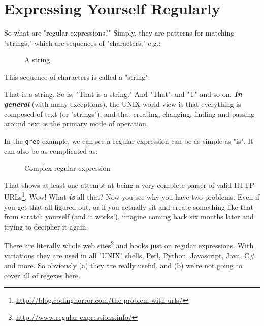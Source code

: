 \documentclass[10pt,american,]{book}
\newenvironment{Shaded}{\begin{snugshade}}{\end{snugshade}}
\newcommand{\KeywordTok}[1]{\textcolor[rgb]{0.13,0.29,0.53}{\textbf{{#1}}}}
\newcommand{\StringTok}[1]{\textcolor[rgb]{0.31,0.60,0.02}{{#1}}}
\newcommand{\NormalTok}[1]{{#1}}
\renewcommand{\href}[2]{#2\footnote{\url{#1}}}
\numberwithin{figure}{chapter}
\DeclareRobustCommand{\drcap}[1]{\begin{figure}[H]\caption{#1}\end{figure}}
\renewcommand{\KeywordTok}[1]{{#1}}
\renewcommand{\StringTok}[1]{{#1}}
\renewcommand{\NormalTok}[1]{{#1}}
\begin{document}
\section*{Expressing Yourself
Regularly}\label{expressing-yourself-regularly}

So what are "regular expressions?" Simply, they are patterns for
matching "strings," which are sequences of "characters," e.g.:

\drcap{A string}

\begin{Shaded}
\begin{Highlighting}[]
\KeywordTok{This} \NormalTok{sequence of characters is called a }\StringTok{"string"}\NormalTok{.}
\end{Highlighting}
\end{Shaded}

That is a string. So is, "That is a string." And "That" and "T" and so
on. \textbf{\emph{In general}} (with many exceptions), the UNIX world
view is that everything is composed of text (or "strings"), and that
creating, changing, finding and passing around text is the primary mode
of operation.

In the \texttt{grep} example, we can see a regular expression can be as
simple as "is". It can also be as complicated as:

\drcap{Complex regular expression}

\begin{Shaded}
\begin{Highlighting}[]
\KeywordTok{(?bhttp}\NormalTok{://[-A-Za-z0-9+}\KeywordTok{&@}\NormalTok{#/%
\end{Highlighting}
\end{Shaded}

That shows at least one attempt at being
\href{http://blog.codinghorror.com/the-problem-with-urls/}{a very
complete parser of valid HTTP URLs}. Wow! What \textbf{\emph{is}} all
that? Now you see why you have two problems. Even if you get that all
figured out, or if you actually sit and create something like that from
scratch yourself (and it works!), imagine coming back six months later
and trying to decipher it again.

There are literally \href{http://www.regular-expressions.info/}{whole
web sites} and books just on regular expressions. With variations they
are used in all "UNIX" shells, Perl, Python, Javascript, Java, C\# and
more. So obviously (a) they are really useful, and (b) we're not going
to cover all of regexes here.
\end{document}

